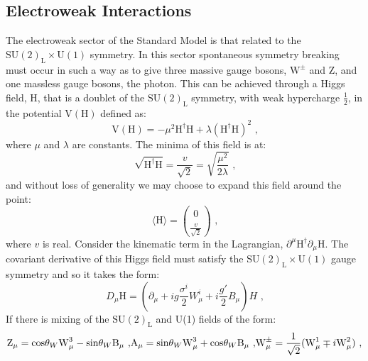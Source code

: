 \subsection{Electroweak Interactions}
The electroweak sector of the Standard Model is that related to the $\text{SU}(2)_{\text{L}} \times \text{U}(1)$ symmetry.  In this sector spontaneous symmetry breaking must occur in such a way as to give three massive gauge bosons,  $\text{W}^{\pm}$ and Z, and one massless gauge bosons, the photon.  This can be achieved through a Higgs field, H, that is a doublet of the $\text{SU}(2)_{\text{L}}$ symmetry, with weak hypercharge $\frac{1}{2}$, in the potential $\text{V}(\text{H})$ defined as:
%
\begin{equation}
\text{V}(\text{H}) = -\mu^{2}\text{H}^{\dagger}\text{H} + \lambda (\text{H}^{\dagger}\text{H})^{2} \text{ ,}
\end{equation}
%
\noindent where $\mu$ and $\lambda$ are constants.  The minima of this field is at:
%
\begin{equation}
\sqrt{\text{H}^{\dagger}\text{H}} = \frac{v}{\sqrt{2}} = \sqrt{\frac{\mu^{2}}{2\lambda}} \text{ ,}
\end{equation}
%
\noindent and without loss of generality we may choose to expand this field around the point:
%
\begin{equation}
\langle \text{H} \rangle = \binom{0}{\frac{v}{\sqrt{2}}} \text{ ,}
\end{equation}
%
\noindent where $v$ is real.  Consider the kinematic term in the Lagrangian, $\partial^{\mu} \text{H}^{\dagger} \partial_{\mu} \text{H}$.  The covariant derivative of this Higgs field must satisfy the $\text{SU}(2)_{\text{L}} \times \text{U}(1)$ gauge symmetry and so it takes the form:
%
\begin{equation}
D_{\mu} \text{H} = (\partial_{\mu} + ig\frac{\sigma^{i}}{2}W^{i}_{\mu} + i\frac{g'}{2}B_{\mu})H \text{ ,}
\end{equation}
%
\noindent If there is mixing of the $\text{SU}(2)_{\text{L}}$ and U(1) fields of the form:
%
\begin{equation}
\text{Z}_{\mu} = \text{cos}{\theta_{W}} \text{W}^{3}_{\mu} - \text{sin}{\theta_{W}} \text{B}_{\mu} \text{ ,}\\
\text{A}_{\mu} = \text{sin}{\theta_{W}} \text{W}^{3}_{\mu} + \text{cos}{\theta_{W}} \text{B}_{\mu} \text{ ,}\\
\text{W}^{\pm}_{\mu} = \frac{1}{\sqrt{2}}(\text{W}^{1}_{\mu} \mp i \text{W}^{2}_{\mu}) \text{ ,}
\end{equation}
